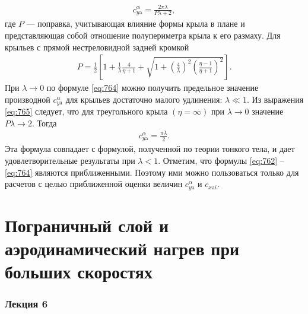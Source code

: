 	\begin{gather}\label{eq:764}
		c_{y\mathrm{a}}^\alpha=\frac{2\pi\lambda}{P\lambda+2},
	\end{gather}
	где $P$ --- поправка, учитывающая влияние формы крыла в плане и представляющая собой отношение полупериметра крыла к его размаху.\n
	Для крыльев с прямой нестреловидной задней кромкой
	\begin{gather}\label{eq:765}
		P=\frac{1}{2}\left[1+\frac{1}{\lambda}\frac{4}{\eta+1}+\sqrt{1+\left(\frac{4}{\lambda}\right)^2\left(\frac{\eta-1}{\eta+1}\right)^2}\right].
	\end{gather}\n
	При $\lambda\to 0$ по формуле \eqref{eq:764} можно получить предельное значение производной $c_{y\mathrm{a}}^\alpha$ для крыльев достаточно малого удлинения: $\lambda\ll 1$.\n
	Из выражения \eqref{eq:765} следует, что для треугольного крыла $\left(\eta=\infty\right)$ при $\lambda\to 0$ значение $P\lambda\to 2$. Тогда
	\begin{gather}\label{eq:766}
		c_{y\mathrm{a}}^\alpha=\frac{\pi\lambda}{2}.
	\end{gather}
	Эта формула совпадает с формулой, полученной по теории тонкого тела, и дает удовлетворительные результаты при $\lambda<1$.\n
	Отметим, что формулы \eqref{eq:762} -- \eqref{eq:764} являются приближенными. Поэтому ими можно пользоваться только для расчетов с целью приближенной оценки величин $c_{y\mathrm{a}}^\alpha$ и $c_{x\mathrm{a}i}$.
	
	\newpage
	\part{Пограничный слой и аэродинамический нагрев при больших скоростях}\label{prt:boundary-layer}
	
	\section{Лекция 6}
	
